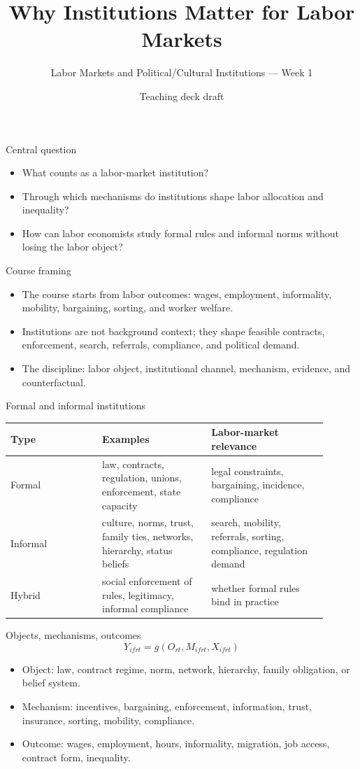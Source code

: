 \documentclass[aspectratio=169,11pt]{beamer}
\title{Why Institutions Matter for Labor Markets}
\subtitle{Labor Markets and Political/Cultural Institutions --- Week 1}
\author{Teaching deck draft}
\date{}
\begin{document}
\begin{frame}
  \titlepage
\end{frame}

\begin{frame}{Central question}
\begin{itemize}
    \item What counts as a labor-market institution?
    \item Through which mechanisms do institutions shape labor allocation and inequality?
    \item How can labor economists study formal rules and informal norms without losing the labor object?
\end{itemize}
\end{frame}

\begin{frame}{Course framing}
\begin{itemize}
    \item The course starts from labor outcomes: wages, employment, informality, mobility, bargaining, sorting, and worker welfare.
    \item Institutions are not background context; they shape feasible contracts, enforcement, search, referrals, compliance, and political demand.
    \item The discipline: labor object, institutional channel, mechanism, evidence, and counterfactual.
\end{itemize}
\end{frame}

\begin{frame}{Formal and informal institutions}
\small
\begin{tabular}{p{0.26\linewidth} p{0.31\linewidth} p{0.33\linewidth}}
\toprule
Type & Examples & Labor-market relevance \\
\midrule
Formal & law, contracts, regulation, unions, enforcement, state capacity & legal constraints, bargaining, incidence, compliance \\
Informal & culture, norms, trust, family ties, networks, hierarchy, status beliefs & search, mobility, referrals, sorting, compliance, regulation demand \\
Hybrid & social enforcement of rules, legitimacy, informal compliance & whether formal rules bind in practice \\
\bottomrule
\end{tabular}
\end{frame}

\begin{frame}{Objects, mechanisms, outcomes}
\[
Y_{ifrt}=g(O_{rt},M_{ifrt},X_{ifrt})
\]
\begin{itemize}
    \item Object: law, contract regime, norm, network, hierarchy, family obligation, or belief system.
    \item Mechanism: incentives, bargaining, enforcement, information, trust, insurance, sorting, mobility, compliance.
    \item Outcome: wages, employment, hours, informality, migration, job access, contract form, inequality.
\end{itemize}
\end{frame}
\end{document}
